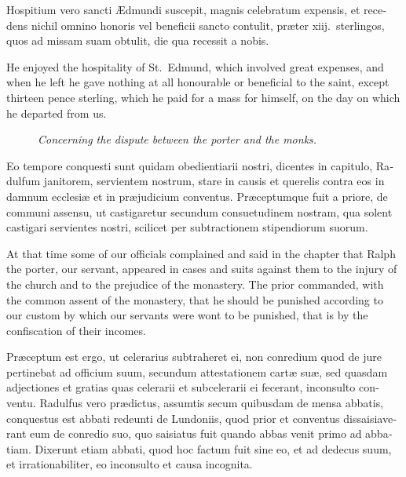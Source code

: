 \documentclass{book}
\newcommand{\blockhead}[4][]{
\begin{figure}
\centering
\vspace{#4}
\parbox{2.75cm}{\begin{center}\footnotesize \color{BrickRed} \emph{#2}\\ #1 \end{center}}
\end{figure}
}
\begin{document}
\begin{paracol}{2}
\switchcolumn*

\begin{otherlanguage}{latin}
Hospitium vero sancti \AE{}dmundi suscepit, magnis celebratum expensis, et recedens nichil omnino honoris vel beneficii sancto contulit, pr\ae{}ter xiij.\ sterlingos, quos ad missam suam obtulit, die qua recessit a nobis.
\end{otherlanguage}

\switchcolumn

He enjoyed the hospitality of St.\ Edmund, which involved great expenses, and when he left he gave nothing at all honourable or beneficial to the saint, except thirteen pence sterling, which he paid for a mass for himself, on the day on which he departed from us.

\switchcolumn*

\clearpage

\begin{otherlanguage}{latin}
\blockhead{Concerning the dispute between the porter and the monks.}{4}{-.1cm}
Eo tempore conquesti sunt quidam obedientiarii nostri, dicentes in capitulo, Radulfum janitorem, servientem nostrum, stare in causis et querelis contra eos in damnum ecclesi\ae{} et in pr\ae{}judicium conventus. Pr\ae{}ceptumque fuit a priore, de communi assensu, ut castigaretur secundum consuetudinem nostram, qua solent castigari servientes nostri, scilicet per subtractionem stipendiorum suorum.

\end{otherlanguage}

\switchcolumn

At that time some of our officials complained and said in the chapter that Ralph the porter, our servant, appeared in cases and suits against them to the injury of the church and to the prejudice of the monastery. The prior commanded, with the common assent of the monastery, that he should be punished according to our custom by which our servants were wont to be punished, that is by the confiscation of their incomes.

\switchcolumn*

\begin{otherlanguage}{latin}
Pr\ae{}ceptum est ergo, ut celerarius subtraheret ei, non conredium quod de jure pertinebat ad officium suum, secundum attestationem cart\ae{} su\ae{}, sed quasdam adjectiones et gratias quas celerarii et subcelerarii ei fecerant, inconsulto conventu. Radulfus vero pr\ae{}dictus, assumtis secum quibusdam de mensa abbatis, conquestus est abbati redeunti de Lundoniis, quod prior et conventus dissaisiaverant eum de conredio suo, quo saisiatus fuit quando abbas venit primo ad abbatiam. Dixerunt etiam abbati, quod hoc factum fuit sine eo, et ad dedecus suum, et irrationabiliter, eo inconsulto et causa incognita. 
\end{otherlanguage}


\end{paracol}
\end{document}
